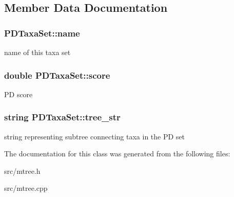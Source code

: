 \subsection{Member Data Documentation}
\hypertarget{classPDTaxaSet_a25fe9fd5ea2bf9ecd576353cba7f84cc}{
\subsubsection[{name}]{ {\bf PDTaxaSet::name}}}
\label{classPDTaxaSet_a25fe9fd5ea2bf9ecd576353cba7f84cc}
name of this taxa set \hypertarget{classPDTaxaSet_aa281eabc1b4daf3d617933ad5be08356}{
\subsubsection[{score}]{\setlength{\rightskip}{0pt plus 5cm}double {\bf PDTaxaSet::score}}}
\label{classPDTaxaSet_aa281eabc1b4daf3d617933ad5be08356}
PD score \hypertarget{classPDTaxaSet_a70b88295e19674b5cee453c411114dc1}{
\subsubsection[{tree\_\-str}]{\setlength{\rightskip}{0pt plus 5cm}string {\bf PDTaxaSet::tree\_\-str}}}
\label{classPDTaxaSet_a70b88295e19674b5cee453c411114dc1}
string representing subtree connecting taxa in the PD set 

The documentation for this class was generated from the following files:\begin{DoxyCompactItemize}
\item 
src/mtree.h\item 
src/mtree.cpp\end{DoxyCompactItemize}
